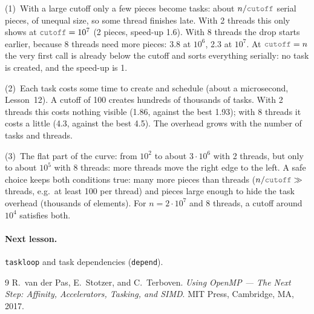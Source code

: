 \documentclass[11pt,a4paper]{article}
\let\origtexttt\texttt
\renewcommand{\texttt}[1]{\textcolor{black!60}{\origtexttt{#1}}}
\begin{document}
\noindent(1)~With a large cutoff only a few pieces become tasks: about $n/\texttt{cutoff}$
serial pieces, of unequal size, so some thread finishes late. With 2 threads this only shows
at $\texttt{cutoff}=10^7$ (2 pieces, speed-up 1.6). With 8 threads the drop starts earlier,
because 8 threads need more pieces: 3.8 at $10^6$, 2.3 at $10^7$. At $\texttt{cutoff}=n$ the
very first call is already below the cutoff and sorts everything serially: no task is
created, and the speed-up is 1.

\noindent(2)~Each task costs some time to create and schedule (about a microsecond, Lesson~12).
A cutoff of 100 creates hundreds of thousands of tasks. With 2 threads this costs nothing
visible (1.86, against the best 1.93); with 8 threads it costs a little (4.3, against the
best 4.5). The overhead grows with the number of tasks and threads.

\noindent(3)~The flat part of the curve: from $10^2$ to about $3\cdot10^6$ with 2 threads, but
only to about $10^5$ with 8 threads: more threads move the right edge to the left. A safe
choice keeps both conditions true: many more pieces than threads ($n/\texttt{cutoff} \gg$
threads, e.g.\ at least 100 per thread) and pieces large enough to hide the task overhead
(thousands of elements). For $n=2\cdot10^7$ and 8 threads, a cutoff around $10^4$ satisfies
both.

\paragraph{Next lesson.} \texttt{taskloop} and task dependencies (\texttt{depend}).

\begin{thebibliography}{9}
 R.~van der Pas, E.~Stotzer, and C.~Terboven. \emph{Using OpenMP --- The Next
  Step: Affinity, Accelerators, Tasking, and SIMD}. MIT Press, Cambridge, MA, 2017.
\end{thebibliography}
\end{document}
